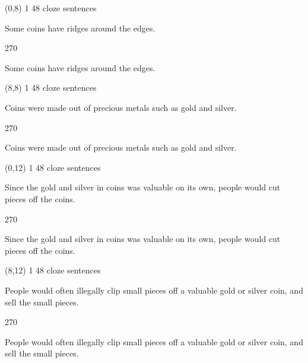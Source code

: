 \documentclass[a4paper]{article}
\newenvironment{itemize*}%
{\begin{itemize}%
 \setlength{\itemsep}{0.5cm}%
 \setlength{\parsep}{0pt}%
 \setlength{\parskip}{0pt}}%
{\end{itemize}}
\newcommand{\mycard}[3]{%
	\small #1 #2
	\par
	\parbox[t][6.8cm][c]{9.5cm}{%
	\par
	\myleft{#3}
	\par
	\myright{#3}
	}
}
\newcommand{\myleft}[1]{%
	\begin{sideways}
	\hspace*{-0.9cm}
		\parbox[t][2.7cm][t]{6.5cm}{%
		\large #1
		}
	\end{sideways}
}
\newcommand{\myright}[1]{%
	\hspace*{6.5cm}
	\begin{turn}{270}
	\hspace*{-7.1cm}
		\parbox[t][2.7cm][t]{6.5cm}{%
		\large #1
		}
	\end{turn}
}
\begin{document}
\begin{textblock}{8}(0,8)
\mycard{1}{48 cloze sentences}{
\begin{itemize*}
\item Some coins have ridges around the edges.
\end{itemize*}
}
\end{textblock}

\begin{textblock}{8}(8,8)
\mycard{1}{48 cloze sentences}{
\begin{itemize*}
\item Coins were made out of precious metals such as gold and silver.
\end{itemize*}
}
\end{textblock}

\begin{textblock}{8}(0,12)
\mycard{1}{48 cloze sentences}{
\begin{itemize*}
\item Since the gold and silver in coins was valuable on its own, people would cut pieces off the coins.
\end{itemize*}
}
\end{textblock}

\begin{textblock}{8}(8,12)
\mycard{1}{48 cloze sentences}{
\begin{itemize*}
\item People would often illegally clip small pieces off a valuable gold or silver coin, and sell the small pieces.
\end{itemize*}
}
\end{textblock}

\null
\newpage
\end{document}
